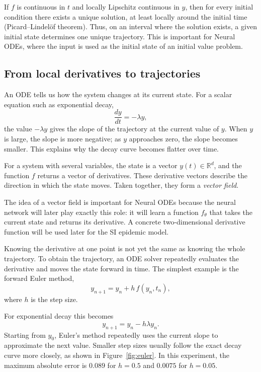 \documentclass[11pt,a4paper]{article}
\begin{document}
If $f$ is continuous in $t$ and locally Lipschitz continuous in $y$, then
for every initial condition there exists a unique solution, at least locally
around the initial time (Picard--Lindel\"of theorem). Thus, on an interval
where the solution exists, a given initial state determines one unique
trajectory. This is important for Neural ODEs, where the input is used as the
initial state of an initial value problem.

\subsection{From local derivatives to trajectories}

An ODE tells us how the system changes at its current state. For a scalar
equation such as exponential decay,
\[
    \frac{dy}{dt}=-\lambda y,
\]
the value $-\lambda y$ gives the slope of the trajectory at the current value
of $y$. When $y$ is large, the slope is more negative; as $y$ approaches zero,
the slope becomes smaller. This explains why the decay curve becomes flatter
over time.

For a system with several variables, the state is a vector
$y(t)\in\mathbb{R}^d$, and the function $f$ returns a vector of derivatives.
These derivative vectors describe the direction in which the state moves.
Taken together, they form a \emph{vector field}.

The idea of a vector field is important for Neural ODEs because the neural
network will later play exactly this role: it will learn a function
$f_\theta$ that takes the current state and returns its derivative. A concrete
two-dimensional derivative function will be used later for the SI epidemic model.

Knowing the derivative at one point is not yet the same as knowing the whole
trajectory. To obtain the trajectory, an ODE solver repeatedly evaluates the
derivative and moves the state forward in time. The simplest example is the
forward Euler method,
\begin{equation}
    y_{n+1}=y_n+h\,f(y_n,t_n),
    \label{eq:euler}
\end{equation}
where $h$ is the step size.

For exponential decay this becomes
\begin{equation}
    y_{n+1}=y_n-h\lambda y_n.
\end{equation}
Starting from $y_0$, Euler's method repeatedly uses the current slope to
approximate the next value. Smaller step sizes usually follow the exact decay
curve more closely, as shown in Figure~\ref{fig:euler}. In this experiment,
the maximum absolute error is $0.089$ for $h=0.5$ and $0.0075$ for $h=0.05$.
\end{document}
